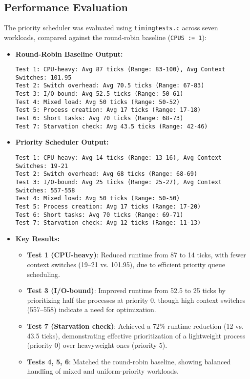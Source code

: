 \documentclass[12pt]{article}
\begin{document}
\subsection{Performance Evaluation}
\label{subsec:priority-performance}

The priority scheduler was evaluated using \texttt{timingtests.c} across seven workloads, compared against the round-robin baseline (\texttt{CPUS := 1}):

\begin{itemize}
    \item \textbf{Round-Robin Baseline Output:}
    \begin{lstlisting}
Test 1: CPU-heavy: Avg 87 ticks (Range: 83-100), Avg Context Switches: 101.95
Test 2: Switch overhead: Avg 70.5 ticks (Range: 67-83)
Test 3: I/O-bound: Avg 52.5 ticks (Range: 50-61)
Test 4: Mixed load: Avg 50 ticks (Range: 50-52)
Test 5: Process creation: Avg 17 ticks (Range: 17-18)
Test 6: Short tasks: Avg 70 ticks (Range: 68-73)
Test 7: Starvation check: Avg 43.5 ticks (Range: 42-46)
    \end{lstlisting}

    \item \textbf{Priority Scheduler Output:}
    \begin{lstlisting}
Test 1: CPU-heavy: Avg 14 ticks (Range: 13-16), Avg Context Switches: 19-21
Test 2: Switch overhead: Avg 68 ticks (Range: 68-69)
Test 3: I/O-bound: Avg 25 ticks (Range: 25-27), Avg Context Switches: 557-558
Test 4: Mixed load: Avg 50 ticks (Range: 50-50)
Test 5: Process creation: Avg 17 ticks (Range: 17-20)
Test 6: Short tasks: Avg 70 ticks (Range: 69-71)
Test 7: Starvation check: Avg 12 ticks (Range: 11-13)
    \end{lstlisting}

    \item \textbf{Key Results:}
    \begin{itemize}
        \item \textbf{Test 1 (CPU-heavy)}: Reduced runtime from 87 to 14 ticks, with fewer context switches (19–21 vs. 101.95), due to efficient priority queue scheduling.
        \item \textbf{Test 3 (I/O-bound)}: Improved runtime from 52.5 to 25 ticks by prioritizing half the processes at priority 0, though high context switches (557–558) indicate a need for optimization.
        \item \textbf{Test 7 (Starvation check)}: Achieved a 72\% runtime reduction (12 vs. 43.5 ticks), demonstrating effective prioritization of a lightweight process (priority 0) over heavyweight ones (priority 5).
        \item \textbf{Tests 4, 5, 6}: Matched the round-robin baseline, showing balanced handling of mixed and uniform-priority workloads.
    \end{itemize}
\end{itemize}
\end{document}

